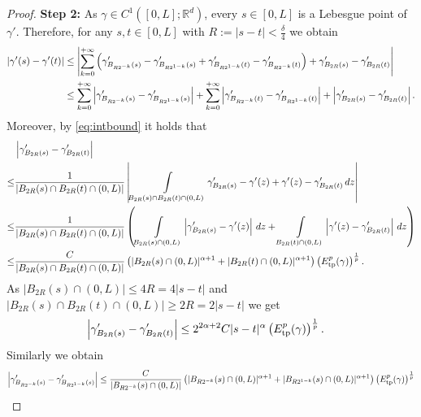\documentclass{article}
\def\R{{\mathbb R}}
\begin{document}
\begin{proof}
    \textbf{Step 2:} As $\gamma\in C^1([0,L];\R^d)$, every $s\in[0,L]$ is a Lebesgue point of $\gamma'$. Therefore, for any $s,t\in[0,L]$ with $R:= |s-t| < \frac{\delta}{4}$ we obtain 
    \begin{align}
        |\gamma'(s) - \gamma'(t)| &\leq \left| \sum\limits_{k=0}^{+\infty} \left( \gamma'_{B_{R2^{-k}}(s)} - \gamma'_{B_{R2^{1-k}}(s)} + \gamma'_{B_{R2^{1-k}}(t)} - \gamma'_{B_{R2^{-k}}(t)}  \right) + \gamma'_{B_{2R}(s)} - \gamma'_{B_{2R}(t)} \right| \notag\\
        &\leq \sum\limits_{k=0}^{+\infty} \left| \gamma'_{B_{R2^{-k}}(s)} - \gamma'_{B_{R2^{1-k}}(s)}\right| + \sum\limits_{k=0}^{+\infty} \left| \gamma'_{B_{R2^{-k}}(t)} - \gamma'_{B_{R2^{1-k}}(t)}\right| + \left| \gamma'_{B_{2R}(s)} - \gamma'_{B_{2R}(t)} \right|. \label{eq:seriesexp}
    \end{align}
    Moreover, by \eqref{eq:intbound} it holds that 
    \begin{align*}
        &\left| \gamma'_{B_{2R}(s)} - \gamma'_{B_{2R}(t)} \right| \\
        \leq& \frac{1}{| B_{2R}(s) \cap B_{2R}(t) \cap(0,L) |} \left| \int\limits_{B_{2R}(s) \cap B_{2R}(t) \cap(0,L) } \gamma'_{B_{2R}(s)} - \gamma'(z) + \gamma'(z) - \gamma'_{B_{2R}(t)} \, dz \right|\\
        \leq&  \frac{1}{| B_{2R}(s) \cap B_{2R}(t) \cap(0,L) |}\left( \int\limits_{B_{2R}(s)\cap(0,L) } \left|  \gamma'_{B_{2R}(s)} - \gamma'(z) \right|\, dz +  \int\limits_{B_{2R}(t)\cap(0,L) } \left| \gamma'(z) - \gamma'_{B_{2R}(t)} \right| \, dz \right)\\
        \leq& \frac{C}{| B_{2R}(s) \cap B_{2R}(t) \cap(0,L) |}\left( |B_{2R}(s) \cap (0,L)|^{\alpha+1} + |B_{2R}(t) \cap (0,L)|^{\alpha+1}  \right) \left(E_{\rm tp}^p(\gamma)\right)^{\frac{1}{p}}. 
    \end{align*}
    As $|B_{2R}(s) \cap (0,L)| \leq 4R = 4|s-t|$ and $|B_{2R}(s) \cap B_{2R}(t) \cap (0,L)| \geq 2R = 2|s-t|$ we get
    \begin{align}
        \left| \gamma'_{B_{2R}(s)} - \gamma'_{B_{2R}(t)} \right| &\leq 2^{2\alpha+2}C|s-t|^{\alpha} \left(E_{\rm tp}^p(\gamma)\right)^{\frac{1}{p}}. \label{eq:diffpoints}
    \end{align}
    Similarly we obtain
    \begin{align}
        \left| \gamma'_{B_{R2^{-k}}(s)} - \gamma'_{B_{R2^{1-k}}(s)} \right| &\leq \frac{C}{|B_{R2^{-k}}(s)\cap(0,L)|}\left( |B_{R2^{-k}}(s)\cap(0,L)|^{\alpha+1} + |B_{R2^{1-k}}(s)\cap(0,L)|^{\alpha+1} \right) \left(E_{\rm tp}^p(\gamma)\right)^{\frac{1}{p}} \notag \\

\end{align}
\end{proof}
\end{document}
